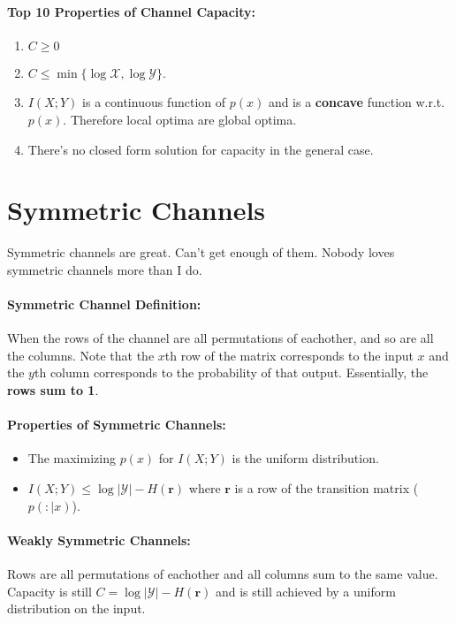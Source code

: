 \documentclass[a4paper,12pt]{report}
\begin{document}
\paragraph{Top 10 Properties of Channel Capacity: } 
\begin{enumerate}
\item $C \geq 0$
\item $C \leq \min \{\log \mathcal X, \log \mathcal Y\}$.
\item $I(X; Y)$ is a continuous function of $p(x)$ and is a \textbf{concave}
function w.r.t. $p(x)$. Therefore local optima are global optima.
\item There's no closed form solution for capacity in the general case. 
\end{enumerate}













\section{Symmetric Channels}

Symmetric channels are great. Can't get enough of them. Nobody loves symmetric
channels more than I do.

\paragraph{Symmetric Channel Definition: } When the rows of the channel are all
permutations of eachother, and so are all the columns. Note that the $x$th row
of the matrix corresponds to the input $x$ and the $y$th column corresponds to
the probability of that output. Essentially, the \textbf{rows sum to 1}.

\paragraph{Properties of Symmetric Channels: } 
\begin{itemize}
\item The maximizing $p(x)$ for $I(X; Y)$ is the uniform distribution.
\item $I(X; Y) \leq \log |\mathcal Y| - H(\mathbf r)$ where $\mathbf r$ is a row
of the transition matrix ($p(:|x)$). 
\end{itemize}

\paragraph{Weakly Symmetric Channels: } Rows are all permutations of eachother
and all columns sum to the same value. Capacity is still $C = \log |\mathcal Y|
- H(\mathbf r)$ and is still achieved by a uniform distribution on the input.
\end{document}
